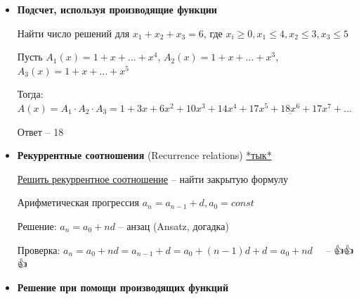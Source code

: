 \documentclass[12pt]{article}
\begin{document}
\begin{itemize}
{\begin{tabular}{p{}|p{}}
            $\frac{1}{1 - x^2} = 1 + x^2 + x^4 + x^6 + \dots \hfill = \sum_{n = 0}^\infty x^{2n}$ & $(1, 0, 1, 0, \dots)$ \\

            $\frac{x}{1 - x} = x + x^2 + \dots \hfill = \sum_{n = 0}^\infty x^{n + 1}$ & $(0, 1, 1, 1, \dots)$ \\

            $\frac{1 - x^k}{1 - x} = 1 + x + x^2 + x^3 + \dots + x^{k - 1} \hfill = \sum_{n = 0}^{k - 1} x^n$ & $\underset{k \text{ раз}}{(1, 1, 1, \dots, 1)}$ \\

            $\frac{d}{dx}\frac{1}{1 - x} = \frac{1}{(1 - x)^2} = 1 + 2x + 3x^2 + \dots \hfill = \sum_{n = 0}^{\infty} (n + 1) x^n$ & $(1, 2, 3, 4, \dots)$ \\\hline

        \end{tabular}
        }

        \vspace{2mm}

        \item \textbf{Подсчет, используя производящие функции}

        Найти число решений для $x_1 + x_2 + x_3 = 6$, где $x_i \geq 0, x_1 \leq 4, x_2 \leq 3, x_3 \leq 5$

        Пусть $A_1(x) = 1 + x + \dots + x^4$, $A_2(x) = 1 + x + \dots + x^3$, $A_3(x) = 1 + x + \dots + x^5$

        Тогда: $A(x) = A_1 \cdot A_2 \cdot A_3 = 1 + 3x + 6x^2 + 10x^3 + 14x^4 + 17x^5 + \underline{18x^6} + 17x^7 + \dots$

        Ответ -- 18

        \item \textbf{Рекуррентные соотношения} (Recurrence relations)
        \hfill\href{https://ru.wikipedia.org/wiki/%D0%A0%D0%B5%D0%BA%D1%83%D1%80%D1%80%D0%B5%D0%BD%D1%82%D0%BD%D0%B0%D1%8F_%D1%84%D0%BE%D1%80%D0%BC%D1%83%D0%BB%D0%B0}{*тык*}


        \underline{Решить рекуррентное соотношение} -- найти закрытую формулу

        \Exs Арифметическая прогрессия $a_n = a_{n - 1} + d, a_0 = const$

        Решение: $a_n = a_0 + nd$ -- анзац (Ansatz, догадка)

        Проверка: $a_n = a_0 + nd = a_{n - 1} + d = a_0 + (n - 1)d + d = a_0 + nd \quad$ -- {\Large👍👍👍}

        \item \textbf{Решение при помощи производящих функций}


\end{itemize}
\end{document}
